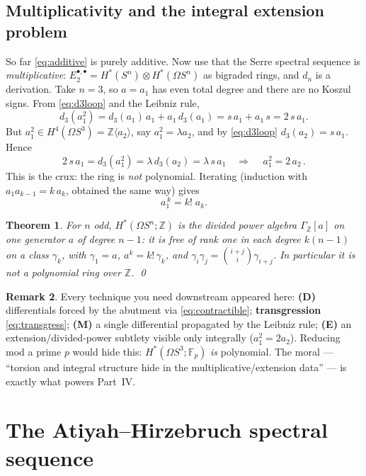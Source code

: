 \documentclass[11pt]{article}
\newtheorem{theorem}{Theorem}[section]
\theoremstyle{definition}
\newtheorem{remark}[theorem]{Remark}
\newcommand{\Z}{\mathbb{Z}}
\newcommand{\F}{\mathbb{F}}
\begin{document}
\subsection{Multiplicativity and the integral extension problem}

So far \eqref{eq:additive} is purely additive. Now use that the Serre spectral
sequence is \emph{multiplicative}: $E_2^{\bullet,\bullet}=H^*(S^n)\otimes
H^*(\Omega S^n)$ as bigraded rings, and $d_n$ is a derivation. Take $n=3$, so
$a=a_1$ has even total degree and there are no Koszul signs. From
\eqref{eq:d3loop} and the Leibniz rule,
\[
  d_3(a_1^2)=d_3(a_1)\,a_1+a_1\,d_3(a_1)=s\,a_1+a_1\,s=2\,s\,a_1 .
\]
But $a_1^2\in H^4(\Omega S^3)=\Z\langle a_2\rangle$, say $a_1^2=\lambda a_2$, and
by \eqref{eq:d3loop} $d_3(a_2)=s\,a_1$. Hence
\[
  2\,s\,a_1=d_3(a_1^2)=\lambda\,d_3(a_2)=\lambda\,s\,a_1
  \quad\Longrightarrow\quad \boxed{\,a_1^2=2\,a_2\,}.
\]
This is the crux: the ring is \emph{not} polynomial. Iterating (induction with
$a_1a_{k-1}=k\,a_k$, obtained the same way) gives
\[
  a_1^{\,k}=k!\;a_k .
\]

\begin{theorem}\label{thm:loop}
For $n$ odd, $H^*(\Omega S^n;\Z)$ is the \emph{divided power algebra}
$\Gamma_\Z[a]$ on one generator $a$ of degree $n-1$: it is free of rank one in
each degree $k(n-1)$ on a class $\gamma_k$, with $\gamma_1=a$,
$a^{k}=k!\,\gamma_k$, and $\gamma_i\gamma_j=\binom{i+j}{i}\gamma_{i+j}$. In
particular it is \emph{not} a polynomial ring over $\Z$. \qed
\end{theorem}

\begin{remark}
Every technique you need downstream appeared here:
\textbf{(D)} differentials forced by the abutment via \eqref{eq:contractible};
\textbf{transgression} \eqref{eq:transgress};
\textbf{(M)} a single differential propagated by the Leibniz rule;
\textbf{(E)} an extension/divided‑power subtlety visible only integrally
($a_1^2=2a_2$). Reducing mod a prime $p$ would hide this: $H^*(\Omega S^3;\F_p)$
\emph{is} polynomial. The moral --- ``torsion and integral structure hide in the
multiplicative/extension data'' --- is exactly what powers Part~IV.
\end{remark}

\section{The Atiyah--Hirzebruch spectral sequence}
\end{document}
